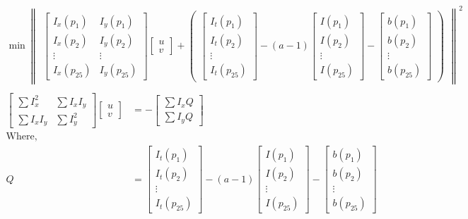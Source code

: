 \begin{align*}
\min \begin{Vmatrix} \begin{bmatrix} I_x(p_1) & I_y(p_1) \\ I_x(p_2) & I_y(p_2) \\ \vdots & \vdots \\ I_x(p_{25}) & I_y(p_{25}) \end{bmatrix}
\begin{bmatrix} u \\ v \end{bmatrix} + \begin{pmatrix}\begin{bmatrix} I_t(p_1) \\ I_t(p_2) \\ \vdots \\ I_t(p_{25}) \end{bmatrix}
- (a-1) \begin{bmatrix} I(p_1) \\ I(p_2) \\ \vdots \\ I(p_{25}) \end{bmatrix} - \begin{bmatrix} b(p_1) \\ b(p_2) \\ \vdots \\ b(p_{25}) \end{bmatrix} \end{pmatrix} \end{Vmatrix}^2   \\
\end{align*}
\begin{align*}
\begin{bmatrix}\sum I_x^2 & \sum I_xI_y \\ \sum I_xI_y & \sum I_y^2\end{bmatrix} \begin{bmatrix} u \\ v \end{bmatrix} &= - \begin{bmatrix} \sum I_xQ \\ \sum I_yQ \end{bmatrix}\\
\text{Where, } \\
Q &= \begin{bmatrix} I_t(p_1) \\ I_t(p_2) \\ \vdots \\ I_t(p_{25}) \end{bmatrix}
- (a-1) \begin{bmatrix} I(p_1) \\ I(p_2) \\ \vdots \\ I(p_{25}) \end{bmatrix} - \begin{bmatrix} b(p_1) \\ b(p_2) \\ \vdots \\ b(p_{25}) \end{bmatrix}
\end{align*}